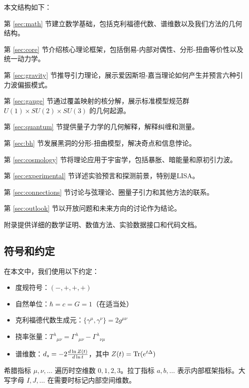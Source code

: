本文结构如下：

第 \ref{sec:math} 节建立数学基础，包括克利福德代数、谱维数以及我们方法的几何结构。

第 \ref{sec:core} 节介绍核心理论框架，包括倒易-内部对偶性、分形-扭曲等价性以及统一动力学。

第 \ref{sec:gravity} 节推导引力理论，展示爱因斯坦-嘉当理论如何产生并预言六种引力波偏振模式。

第 \ref{sec:gauge} 节通过覆盖映射的核分解，展示标准模型规范群 $U(1) \times SU(2) \times SU(3)$ 的几何起源。

第 \ref{sec:quantum} 节提供量子力学的几何解释，解释纠缠和测量。

第 \ref{sec:bh} 节发展黑洞的分形-扭曲模型，解决奇点和信息悖论。

第 \ref{sec:cosmology} 节将理论应用于宇宙学，包括暴胀、暗能量和原初引力波。

第 \ref{sec:experimental} 节详述实验预言和探测前景，特别是LISA。

第 \ref{sec:connections} 节讨论与弦理论、圈量子引力和其他方法的联系。

第 \ref{sec:outlook} 节以开放问题和未来方向的讨论作为结论。

附录提供详细的数学证明、数值方法、实验数据接口和代码文档。

\subsection{符号和约定}

在本文中，我们使用以下约定：
\begin{itemize}
    \item 度规符号：$(-,+,+,+)$
    \item 自然单位：$\hbar = c = G = 1$（在适当处）
    \item 克利福德代数生成元：$\{\gamma^\mu, \gamma^\nu\} = 2g^{\mu\nu}$
    \item 挠率张量：$T^\lambda{}_{\mu\nu} = \Gamma^\lambda{}_{\mu\nu} - \Gamma^\lambda{}_{\nu\mu}$
    \item 谱维数：$d_s = -2 \frac{d \ln Z(t)}{d \ln t}$，其中 $Z(t) = \mathrm{Tr}(e^{t\Delta})$
\end{itemize}

希腊指标 $\mu, \nu, \ldots$ 遍历时空维数 $0,1,2,3$。拉丁指标 $a,b,\ldots$ 表示内部框架指标。大写字母 $I,J,\ldots$ 在需要时标记内部空间维数。
